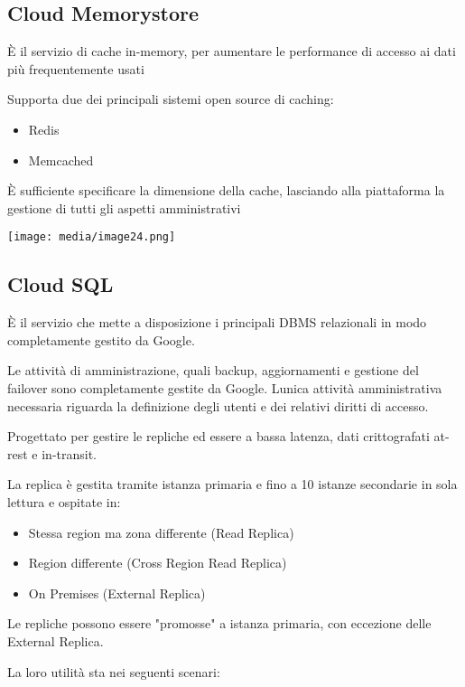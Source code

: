 \subsection{Cloud Memorystore}\label{cloud-memorystore}

È il servizio di cache in-memory, per aumentare le performance di
accesso ai dati più frequentemente usati

Supporta due dei principali sistemi open source di caching:

\begin{itemize}
\item
  Redis
\item
  Memcached
\end{itemize}

È sufficiente specificare la dimensione della cache, lasciando alla
piattaforma la gestione di tutti gli aspetti amministrativi

\texttt{[image: media/image24.png]}

\subsection{Cloud SQL}\label{cloud-sql}

È il servizio che mette a disposizione i principali DBMS relazionali in
modo completamente gestito da Google.

Le attività di amministrazione, quali backup, aggiornamenti e gestione
del failover sono completamente gestite da Google.
L\textquotesingle unica attività amministrativa necessaria riguarda la
definizione degli utenti e dei relativi diritti di accesso.

Progettato per gestire le repliche ed essere a bassa latenza, dati
crittografati at-rest e in-transit.

La replica è gestita tramite istanza primaria e fino a 10 istanze
secondarie in sola lettura e ospitate in:

\begin{itemize}
\item
  Stessa region ma zona differente (Read Replica)
\item
  Region differente (Cross Region Read Replica)
\item
  On Premises (External Replica)
\end{itemize}

Le repliche possono essere "promosse" a istanza primaria, con eccezione
delle External Replica.

La loro utilità sta nei seguenti scenari:

